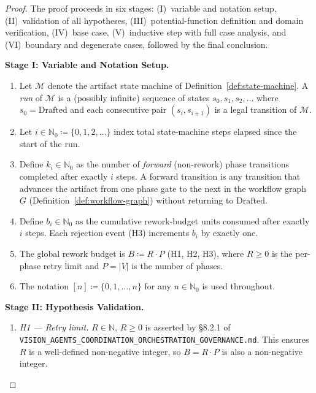 \documentclass[12pt]{article}
\theoremstyle{definition}
\newcommand{\code}[1]{\texttt{#1}}
\newcommand{\VisionGov}{\code{VISION\_AGENTS\_\allowbreak COORDINATION\_\allowbreak ORCHESTRATION\_\allowbreak GOVERNANCE.md}}
\begin{document}
\begin{proof}
The proof proceeds in six stages: (I)~variable and notation setup,
(II)~validation of all hypotheses, (III)~potential-function definition
and domain verification, (IV)~base case, (V)~inductive step with full
case analysis, and (VI)~boundary and degenerate cases, followed by the
final conclusion.

\medskip
\noindent\textbf{Stage I: Variable and Notation Setup.}

\begin{enumerate}
  \item Let $\mathcal{M}$ denote the artifact state machine of
        Definition~\ref{def:state-machine}.  A \emph{run} of
        $\mathcal{M}$ is a (possibly infinite) sequence of states
        $s_0, s_1, s_2, \ldots$ where $s_0 = \mathrm{Drafted}$ and
        each consecutive pair $(s_i, s_{i+1})$ is a legal transition
        of $\mathcal{M}$.

  \item Let $i \in \mathbb{N}_0 \coloneqq \{0,1,2,\ldots\}$ index
        total state-machine steps elapsed since the start of the run.

  \item Define $k_i \in \mathbb{N}_0$ as the number of
        \emph{forward} (non-rework) phase transitions completed after
        exactly $i$ steps.  A forward transition is any transition
        that advances the artifact from one phase gate to the next in
        the workflow graph $G$ (Definition~\ref{def:workflow-graph})
        without returning to $\mathrm{Drafted}$.

  \item Define $b_i \in \mathbb{N}_0$ as the cumulative
        rework-budget units consumed after exactly $i$ steps.  Each
        rejection event (H3) increments $b_i$ by exactly one.

  \item The global rework budget is $B \coloneqq R \cdot P$ (H1,
        H2, H3), where $R \geq 0$ is the per-phase retry limit and
        $P = |V|$ is the number of phases.

  \item The notation $[n] \coloneqq \{0, 1, \ldots, n\}$ for any
        $n \in \mathbb{N}_0$ is used throughout.
\end{enumerate}

\medskip
\noindent\textbf{Stage II: Hypothesis Validation.}

\begin{enumerate}
  \item \emph{H1 — Retry limit.}  $R \in \mathbb{N}$, $R \geq 0$ is
        asserted by \S8.2.1 of
        \VisionGov{}.  This ensures $R$ is a well-defined
        non-negative integer, so $B = R \cdot P$ is also a
        non-negative integer.


\end{enumerate}
\end{proof}
\end{document}
